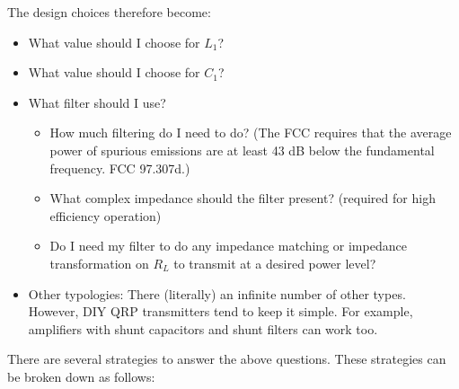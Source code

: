 \documentclass[10pt,letterpaper]{article}
\begin{document}
The design choices therefore become:
\begin{itemize}
\item What value should I choose for $L_1$?
\item What value should I choose for $C_1$?
\item What filter should I use?
\begin{itemize}
\item How much filtering do I need to do? (The FCC requires that the average power of spurious emissions are at least 43 dB below the fundamental frequency. FCC 97.307d.)
\item What complex impedance should the filter present? (required for high efficiency operation)
\item Do I need my filter to do any impedance matching or impedance transformation on $R_L$ to transmit at a desired power level?
\end{itemize}
\item Other typologies: There (literally) an infinite number of other types. However, DIY QRP transmitters tend to keep it simple. For example, amplifiers with shunt capacitors and shunt filters can work too.
\end{itemize}

There are several strategies to answer the above questions. These strategies can be broken down as follows:
\end{document}
